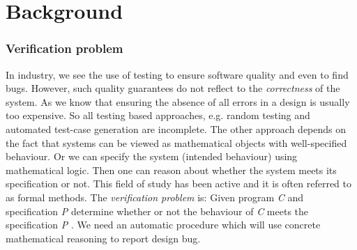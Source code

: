 \documentclass[14pt]{article}
\begin{document}
\section{Background}\label{background}
\subsubsection*{Verification problem}\label{verification problem}
In industry, we see the use of testing to ensure software quality and even to find bugs. However, such quality guarantees do not reflect to the \textit{correctness} of  the system. As we know that ensuring the absence of all errors in a design is usually too expensive. So all testing based approaches, e.g. random testing and automated test-case generation are incomplete. The other approach depends on the fact that systems can be viewed as mathematical objects with well-specified behaviour. Or we can specify the system (intended behaviour) using mathematical logic. Then one can reason about whether the system meets its specification or not. This field of study has been active and it is often referred to as formal methods.
The \textit{verification problem} is: Given program \textit{C} and specification \textit{P} determine whether or not the behaviour of \textit{C} meets the specification \textit{P} \cite{model checking emerson}. We need an automatic procedure which will use concrete mathematical reasoning to report design bug.
\end{document}
